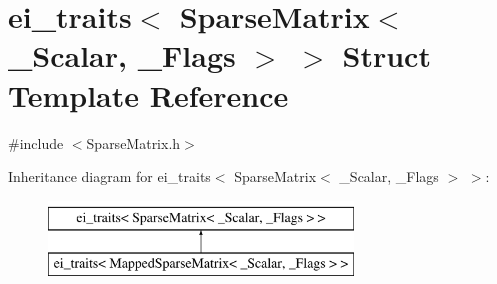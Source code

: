 \hypertarget{structei__traits_3_01_sparse_matrix_3_01___scalar_00_01___flags_01_4_01_4}{\section{ei\-\_\-traits$<$ Sparse\-Matrix$<$ \-\_\-\-Scalar, \-\_\-\-Flags $>$ $>$ Struct Template Reference}
\label{structei__traits_3_01_sparse_matrix_3_01___scalar_00_01___flags_01_4_01_4}
}


{\ttfamily \#include $<$Sparse\-Matrix.\-h$>$}

Inheritance diagram for ei\-\_\-traits$<$ Sparse\-Matrix$<$ \-\_\-\-Scalar, \-\_\-\-Flags $>$ $>$\-:\begin{figure}[H]
\begin{center}
\leavevmode
\includegraphics[height=2.000000cm]{structei__traits_3_01_sparse_matrix_3_01___scalar_00_01___flags_01_4_01_4}
\end{center}
\end{figure}
